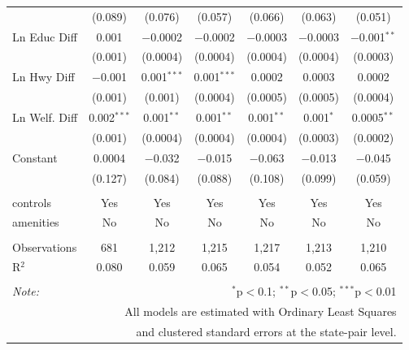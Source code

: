 \begin{table}[!htbp]
\begin{tabular}{@{\extracolsep{5pt}}lcccccc}
  & (0.089) & (0.076) & (0.057) & (0.066) & (0.063) & (0.051) \\ 
  Ln Educ Diff & 0.001 & $-$0.0002 & $-$0.0002 & $-$0.0003 & $-$0.0003 & $-$0.001$^{**}$ \\ 
  & (0.001) & (0.0004) & (0.0004) & (0.0004) & (0.0004) & (0.0003) \\ 
  Ln Hwy Diff & $-$0.001 & 0.001$^{***}$ & 0.001$^{***}$ & 0.0002 & 0.0003 & 0.0002 \\ 
  & (0.001) & (0.001) & (0.0004) & (0.0005) & (0.0005) & (0.0004) \\ 
  Ln Welf. Diff & 0.002$^{***}$ & 0.001$^{**}$ & 0.001$^{**}$ & 0.001$^{**}$ & 0.001$^{*}$ & 0.0005$^{**}$ \\ 
  & (0.001) & (0.0004) & (0.0004) & (0.0004) & (0.0003) & (0.0002) \\ 
  Constant & 0.0004 & $-$0.032 & $-$0.015 & $-$0.063 & $-$0.013 & $-$0.045 \\ 
  & (0.127) & (0.084) & (0.088) & (0.108) & (0.099) & (0.059) \\ 
 \hline \\[-1.8ex] 
controls & Yes & Yes & Yes & Yes & Yes & Yes \\ 
amenities & No & No & No & No & No & No \\ 
\hline \\[-1.8ex] 
Observations & 681 & 1,212 & 1,215 & 1,217 & 1,213 & 1,210 \\ 
R$^{2}$ & 0.080 & 0.059 & 0.065 & 0.054 & 0.052 & 0.065 \\ 
\hline 
\hline \\[-1.8ex] 
\textit{Note:}  & \multicolumn{6}{r}{$^{*}$p$<$0.1; $^{**}$p$<$0.05; $^{***}$p$<$0.01} \\ 
 & \multicolumn{6}{r}{All models are estimated with Ordinary Least Squares} \\ 
 & \multicolumn{6}{r}{and clustered standard errors at the state-pair level.} \\ 
\end{tabular} 
\end{table} 
